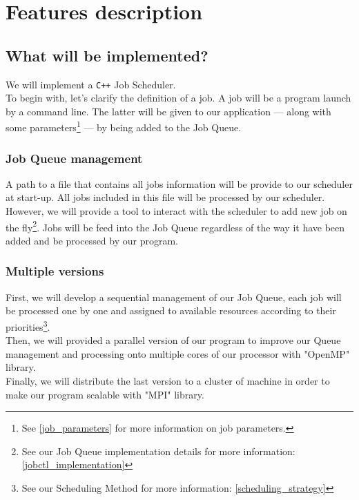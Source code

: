 \documentclass[a4paper,11pt]{article}
\begin{document}
\newpage

\section{Features description}

\subsection{What will be implemented?}

We will implement a \texttt{C++} Job Scheduler.\\
To begin with, let's clarify the definition of a job.
A job will be a program launch by a command line. The latter will be given to our application --- along with some parameters\footnote{See \ref{job_parameters} for more information on job parameters.} --- by being added to the Job Queue.

\subsubsection{Job Queue management}

A path to a file that contains all jobs information will be provide to our scheduler at start-up. All jobs included in this file will be processed by our scheduler.\\ However, we will provide a tool to interact with the scheduler to add new job on the fly\footnote{See our Job Queue implementation details for more information: \ref{jobctl_implementation}}.
Jobs will be feed into the Job Queue regardless of the way it have been added and be processed by our program.

\subsubsection{Multiple versions}

First, we will develop a sequential management of our Job Queue, each job will be processed one by one and assigned to available resources according to their priorities\footnote{See our Scheduling Method for more information: \ref{scheduling_strategy}}.\\
Then, we will provided a parallel version of our program to improve our Queue management and processing onto multiple cores of our processor with "OpenMP" library.\\
Finally, we will distribute the last version to a cluster of machine in order to make our program scalable with "MPI" library.
\end{document}
